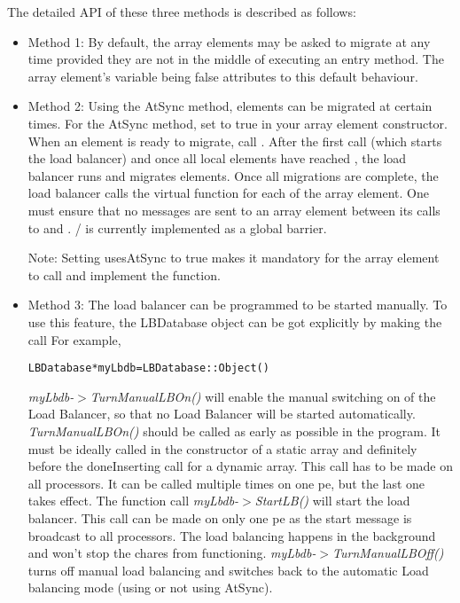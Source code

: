 The detailed API of these three methods is described as follows:
\begin{itemize}

\item Method 1: By default, the array elements may be asked to migrate at any time
provided they are not in the middle of executing an entry method. 
The array element's variable  being false attributes
to this default behaviour. 

\item  Method 2: Using the AtSync method, elements can be migrated at certain
times.  For the AtSync method, set  to true in your 
array element constructor.  When an element is ready to migrate,
call .  
After the first  call (which starts the load balancer)
and once all local elements have reached ,
the load balancer runs and migrates elements.  Once
all migrations are complete, the load balancer calls the 
virtual function  for each of the
array element.  One must ensure that no messages are
sent to an array element between its calls to  and
. / is currently
implemented as a global barrier.

Note: Setting usesAtSync to true makes it mandatory for the array
element to call  and implement the 
 function.

\item Method 3: The load balancer can be programmed to be started
manually. 
 To use this feature, the LBDatabase object
can be got explicitly by making the call 
For example, 

\begin{alltt}
LBDatabase * myLbdb = LBDatabase::Object()
\end{alltt}

{\em myLbdb-$>$TurnManualLBOn()} will enable the manual switching on of
the Load Balancer, so that no Load Balancer will be started automatically.
{\em TurnManualLBOn()} should be called as early as possible in the
program. It must be ideally called in the constructor of a static array and
definitely before the doneInserting call for a dynamic array.  This call 
has to be made on all processors. It can be called multiple times on one 
pe, but the last one takes effect.   
The function call {\em myLbdb-$>$StartLB()} will start the load balancer. 
This call can be made on only one pe as the start message is broadcast 
to all processors. The load balancing happens in the background and 
won't stop the chares from functioning. 
{\em myLbdb-$>$TurnManualLBOff()} turns off manual load balancing and switches back to the automatic Load balancing mode (using or not using AtSync). 

\end{itemize}


